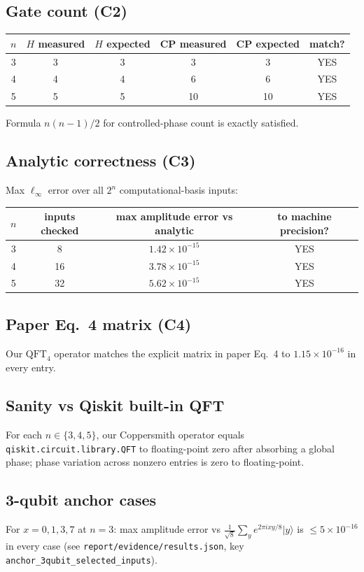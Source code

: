 \documentclass[11pt]{article}
\begin{document}
\subsection{Gate count (C2)}
\begin{center}
\begin{tabular}{cccccc}
\toprule
$n$ & $H$ measured & $H$ expected & CP measured & CP expected & match? \\
\midrule
3 & 3 & 3 & 3 & 3 & YES \\
4 & 4 & 4 & 6 & 6 & YES \\
5 & 5 & 5 & 10 & 10 & YES \\
\bottomrule
\end{tabular}
\end{center}
Formula $n(n-1)/2$ for controlled-phase count is exactly satisfied.

\subsection{Analytic correctness (C3)}
Max $\ell_\infty$ error over all $2^n$ computational-basis inputs:
\begin{center}
\begin{tabular}{cccc}
\toprule
$n$ & inputs checked & max amplitude error vs analytic & to machine precision? \\
\midrule
3 & 8  & $1.42\times10^{-15}$ & YES \\
4 & 16 & $3.78\times10^{-15}$ & YES \\
5 & 32 & $5.62\times10^{-15}$ & YES \\
\bottomrule
\end{tabular}
\end{center}

\subsection{Paper Eq.~4 matrix (C4)}
Our $\text{QFT}_4$ operator matches the explicit matrix in paper Eq.~4
to $1.15\times10^{-16}$ in every entry.

\subsection{Sanity vs Qiskit built-in QFT}
For each $n\in\{3,4,5\}$, our Coppersmith operator equals
\texttt{qiskit.circuit.library.QFT} to floating-point zero after
absorbing a global phase; phase variation across nonzero entries is
zero to floating-point.

\subsection{3-qubit anchor cases}
For $x=0,1,3,7$ at $n=3$: max amplitude error vs
$\frac{1}{\sqrt8}\sum_y e^{2\pi i xy/8}|y\rangle$ is
$\le 5\times10^{-16}$ in every case (see
\texttt{report/evidence/results.json},
key \texttt{anchor\_3qubit\_selected\_inputs}).
\end{document}
